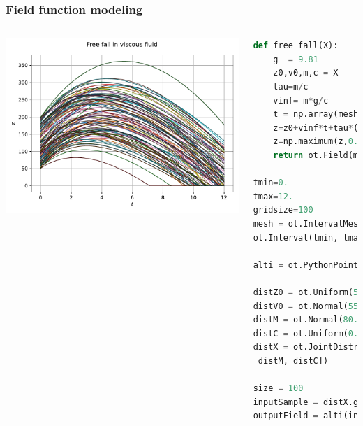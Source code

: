 \documentclass{beamer}
\begin{document}
\begin{frame}[containsverbatim]
\frametitle{Field function modeling}

\scriptsize 
\begin{columns}

    \includegraphics[width=1.\textwidth]{figures/Trajectories.pdf}
    
        
\tiny
\begin{lstlisting}[language=Python, numbers = none]
def free_fall(X):
    g  = 9.81
    z0,v0,m,c = X
    tau=m/c
    vinf=-m*g/c
    t = np.array(mesh.getVertices().asPoint())
    z=z0+vinf*t+tau*(v0-vinf)*(1-np.exp(-t/tau))
    z=np.maximum(z,0.0)
    return ot.Field(mesh, z.reshape(-1, 1))

tmin=0. 
tmax=12.
gridsize=100 
mesh = ot.IntervalMesher([gridsize-1]).build(
ot.Interval(tmin, tmax))

alti = ot.PythonPointToFieldFunction(4, mesh,  1, free_fall)

distZ0 = ot.Uniform(50.0, 200.0)
distV0 = ot.Normal(55.0, 10.0)
distM = ot.Normal(80.0, 8.0)
distC = ot.Uniform(0.0, 30.0)
distX = ot.JointDistribution([distZ0, distV0,
 distM, distC])

size = 100
inputSample = distX.getSample(size)
outputField = alti(inputSample)
\end{lstlisting}

\end{columns}
\end{frame}


\end{document}
